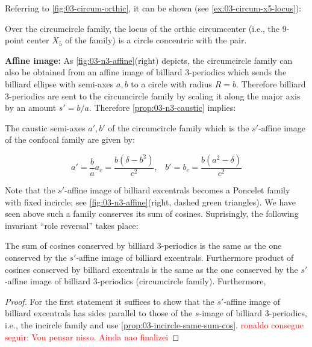 Referring to  \cref{fig:03-circum-orthic}, it can be shown (see \cref{ex:03-circum-x5-locus}):

\begin{lemma}
Over the circumcircle family, the locus of the orthic circumcenter (i.e., the 9-point center $X_5$ of the family) is a circle concentric with the pair.
\label{lem:03-circum-x5-locus}
\end{lemma}


\noindent \textbf{Affine image:} As \cref{fig:03-n3-affine}(right) depicts, the circumcircle family can also be obtained from an affine image of billiard 3-periodics which sends the billiard ellipse with semi-axes $a,b$ to a circle with radius $R=b$. Therefore billiard 3-periodics are sent to the circumcircle family by scaling it along the major axis by an amount $s'={b/a}$. Therefore \cref{prop:03-n3-caustic} implies:

\begin{lemma}
The caustic semi-axes $a',b'$ of the circumcircle family which is the $s'$-affine image of the confocal family are given by:

\[ a'=\frac{b}{a}{a_c}=\frac{b(\delta-b^2)}{c^2},\;\;\;b'=b_c=\frac{b(a^2-\delta)}{c^2} \]
\label{lem:03-circumcircle-affine}
\end{lemma}

\noindent Note that the $s'$-affine image of billiard excentrals becomes a Poncelet family with fixed incircle; see \cref{fig:03-n3-affine}(right, dashed green triangles). We have seen above such a family conserves its sum of cosines. Suprisingly, the following invariant ``role reversal'' takes place:

\begin{proposition}
The sum of cosines conserved by billiard 3-periodics is the same as the one conserved by the $s'$-affine image of billiard excentrals. Furthermore product of cosines conserved by billiard excentrals is the same as the one conserved by the $s'$-affine image of billiard 3-periodics (circumcircle family). Furthermore, \label{prop:03-n3-role-reversal}
\end{proposition}

\begin{proof}
For the first statement it suffices to show that the $s'$-affine image of billiard excentrals has sides parallel to those of the $s$-image of billiard 3-periodics, i.e., the incircle family and use \cref{prop:03-incircle-same-sum-cos}.
\textcolor{red}{ronaldo consegue seguir: Vou pensar nisso. Ainda nao finalizei}
\end{proof}


